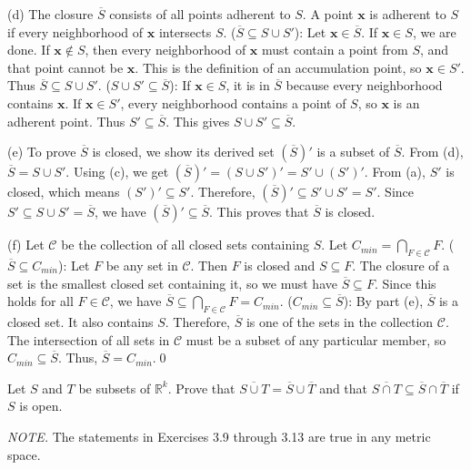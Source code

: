 (d) The closure $\overline{S}$ consists of all points adherent to $S$. A point $\mathbf{x}$ is adherent to $S$ if every neighborhood of $\mathbf{x}$ intersects $S$.
($\overline{S} \subseteq S \cup S'$): Let $\mathbf{x} \in \overline{S}$. If $\mathbf{x} \in S$, we are done. If $\mathbf{x} \notin S$, then every neighborhood of $\mathbf{x}$ must contain a point from $S$, and that point cannot be $\mathbf{x}$. This is the definition of an accumulation point, so $\mathbf{x} \in S'$. Thus $\overline{S} \subseteq S \cup S'$.
($S \cup S' \subseteq \overline{S}$): If $\mathbf{x} \in S$, it is in $\overline{S}$ because every neighborhood contains $\mathbf{x}$. If $\mathbf{x} \in S'$, every neighborhood contains a point of $S$, so $\mathbf{x}$ is an adherent point. Thus $S' \subseteq \overline{S}$. This gives $S \cup S' \subseteq \overline{S}$.

(e) To prove $\overline{S}$ is closed, we show its derived set $(\overline{S})'$ is a subset of $\overline{S}$. From (d), $\overline{S} = S \cup S'$. Using (c), we get $(\overline{S})' = (S \cup S')' = S' \cup (S')'$. From (a), $S'$ is closed, which means $(S')' \subseteq S'$. Therefore, $(\overline{S})' \subseteq S' \cup S' = S'$. Since $S' \subseteq S \cup S' = \overline{S}$, we have $(\overline{S})' \subseteq \overline{S}$. This proves that $\overline{S}$ is closed.

(f) Let $\mathcal{C}$ be the collection of all closed sets containing $S$. Let $C_{min} = \bigcap_{F \in \mathcal{C}} F$.
($\overline{S} \subseteq C_{min}$): Let $F$ be any set in $\mathcal{C}$. Then $F$ is closed and $S \subseteq F$. The closure of a set is the smallest closed set containing it, so we must have $\overline{S} \subseteq F$. Since this holds for all $F \in \mathcal{C}$, we have $\overline{S} \subseteq \bigcap_{F \in \mathcal{C}} F = C_{min}$.
($C_{min} \subseteq \overline{S}$): By part (e), $\overline{S}$ is a closed set. It also contains $S$. Therefore, $\overline{S}$ is one of the sets in the collection $\mathcal{C}$. The intersection of all sets in $\mathcal{C}$ must be a subset of any particular member, so $C_{min} \subseteq \overline{S}$.
Thus, $\overline{S} = C_{min}$.\qed


\begin{problembox}

Let $S$ and $T$ be subsets of $\mathbb{R}^k$. Prove that $\overline{S \cup T} = \overline{S} \cup \overline{T}$ and that $\overline{S \cap T} \subseteq \overline{S} \cap \overline{T}$ if $S$ is open.

\textit{NOTE.} The statements in Exercises 3.9 through 3.13 are true in any metric space.
\end{problembox}

